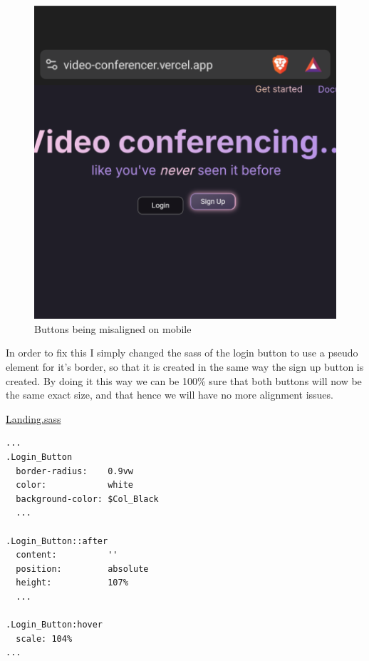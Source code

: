 \begin{figure}[h]
\centering

\includegraphics[scale=0.2]{Images/Button_misalignment.png}

\caption{Buttons being misaligned on mobile}
\end{figure}

In order to fix this I simply changed the sass of the login
button to use a pseudo element for it's border, so that it is
created in the same way the sign up button is created. By
doing it this way we can be 100\% sure that both buttons will
now be the same exact size, and that hence we will have no
more alignment issues. \\ \vspace{0.2cm}

\underline{Landing.sass}

\begin{verbatim}
...
.Login_Button
  border-radius:    0.9vw 
  color:            white
  background-color: $Col_Black
  ... 

.Login_Button::after
  content:          ''
  position:         absolute
  height:           107%
  ...

.Login_Button:hover
  scale: 104%
...
\end{verbatim}

